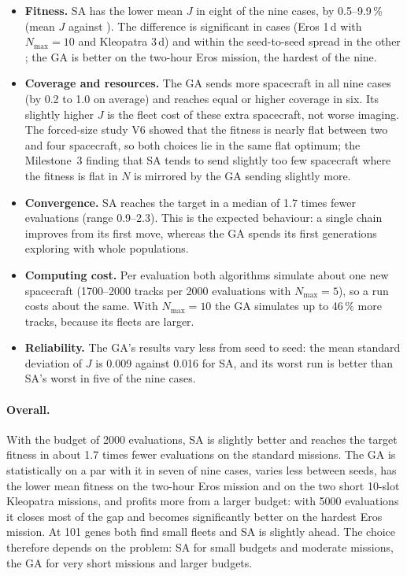 \begin{itemize}
\item \textbf{Fitness.} \ac{SA} has the lower mean $J$ in eight of the nine cases, by 0.5--9.9\,\%
(mean $J$ \saMeanJ{} against \gaMeanJ). The difference is significant in \saWins{} cases (Eros 1\,d
with $N_{\max}=10$ and Kleopatra 3\,d) and within the seed-to-seed spread in the other \gaTies; the
\ac{GA} is better on the two-hour Eros mission, the hardest of the nine.
\item \textbf{Coverage and resources.} The \ac{GA} sends more spacecraft in all nine cases (by 0.2 to
1.0 on average) and reaches equal or higher coverage in six. Its slightly higher $J$ is the fleet cost
of these extra spacecraft, not worse imaging. The forced-size study V6 showed that the fitness is
nearly flat between two and four spacecraft, so both choices lie in the same flat optimum; the
Milestone~3 finding that \ac{SA} tends to send slightly too few spacecraft where the fitness is
flat in $N$ is mirrored by the \ac{GA} sending slightly more.
\item \textbf{Convergence.} \ac{SA} reaches the target in a median of 1.7 times fewer evaluations
(range 0.9--2.3). This is the expected behaviour: a single chain improves from its first move,
whereas the \ac{GA} spends its first generations exploring with whole populations.
\item \textbf{Computing cost.} Per evaluation both algorithms simulate about one new spacecraft
(1700--2000 tracks per 2000 evaluations with $N_{\max}=5$), so a run costs about the same. With
$N_{\max}=10$ the \ac{GA} simulates up to 46\,\% more tracks, because its fleets are larger.
\item \textbf{Reliability.} The \ac{GA}'s results vary less from seed to seed: the mean standard
deviation of $J$ is 0.009 against 0.016 for \ac{SA}, and its worst run is better than \ac{SA}'s
worst in five of the nine cases.
\end{itemize}

\paragraph{Overall.} With the budget of 2000 evaluations, \ac{SA} is slightly better and reaches the
target fitness in about 1.7 times fewer evaluations on the standard missions. The \ac{GA} is statistically on a par with it in seven
of nine cases, varies less between seeds, has the lower mean fitness on the two-hour Eros mission and
on the two short 10-slot Kleopatra missions, and profits more from a larger budget: with 5000
evaluations it closes most of the gap and becomes significantly better on the hardest Eros mission.
At 101 genes both find small fleets and \ac{SA} is slightly ahead. The choice therefore depends on
the problem: \ac{SA} for small budgets and moderate missions, the \ac{GA} for very short missions
and larger budgets.


